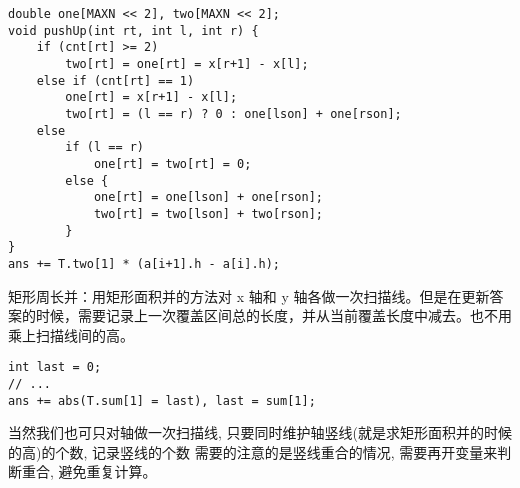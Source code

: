 \begin{verbatim}
double one[MAXN << 2], two[MAXN << 2];
void pushUp(int rt, int l, int r) {
    if (cnt[rt] >= 2)
        two[rt] = one[rt] = x[r+1] - x[l];
    else if (cnt[rt] == 1)
        one[rt] = x[r+1] - x[l];
        two[rt] = (l == r) ? 0 : one[lson] + one[rson];
    else
        if (l == r)
            one[rt] = two[rt] = 0;
        else {
            one[rt] = one[lson] + one[rson];
            two[rt] = two[lson] + two[rson];
        }
}
ans += T.two[1] * (a[i+1].h - a[i].h);
\end{verbatim}

\noindent 矩形周长并：用矩形面积并的方法对 x 轴和 y 轴各做一次扫描线。但是在更新答案的时候，需要记录上一次覆盖区间总的长度，并从当前覆盖长度中减去。也不用乘上扫描线间的高。
\begin{verbatim}
int last = 0;
// ...
ans += abs(T.sum[1] = last), last = sum[1];
\end{verbatim}

\noindent 当然我们也可只对轴做一次扫描线, 只要同时维护轴竖线(就是求矩形面积并的时候的高)的个数, 记录竖线的个数 
需要的注意的是竖线重合的情况, 需要再开变量来判断重合, 避免重复计算。

